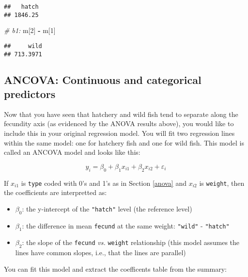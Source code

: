 \documentclass[]{book}
\newenvironment{Shaded}{\begin{snugshade}}{\end{snugshade}}
\newcommand{\DecValTok}[1]{\textcolor[rgb]{0.00,0.00,0.81}{#1}}
\newcommand{\StringTok}[1]{\textcolor[rgb]{0.31,0.60,0.02}{#1}}
\newcommand{\CommentTok}[1]{\textcolor[rgb]{0.56,0.35,0.01}{\textit{#1}}}
\newcommand{\OperatorTok}[1]{\textcolor[rgb]{0.81,0.36,0.00}{\textbf{#1}}}
\newcommand{\NormalTok}[1]{#1}
\providecommand{\tightlist}{%
  \setlength{\itemsep}{0pt}\setlength{\parskip}{0pt}}
\theoremstyle{definition}
\theoremstyle{definition}
\theoremstyle{definition}
\theoremstyle{remark}
\begin{document}
\begin{verbatim}
##   hatch 
## 1846.25
\end{verbatim}

\begin{Shaded}
\begin{Highlighting}[]
\CommentTok{# b1:}
\NormalTok{m[}\DecValTok{2}\NormalTok{] }\OperatorTok{-}\StringTok{ }\NormalTok{m[}\DecValTok{1}\NormalTok{]}
\end{Highlighting}
\end{Shaded}

\begin{verbatim}
##     wild 
## 713.3971
\end{verbatim}

\subsection{ANCOVA: Continuous and categorical
predictors}\label{ancova-continuous-and-categorical-predictors}

Now that you have seen that hatchery and wild fish tend to separate
along the fecundity axis (as evidenced by the ANOVA results above), you
would like to include this in your original regression model. You will
fit two regression lines within the same model: one for hatchery fish
and one for wild fish. This model is called an ANCOVA model and looks
like this:

\begin{equation}
  y_i=\beta_0 + \beta_1 x_{i1} + \beta_2 x_{i2} + \varepsilon_i
\label{eq:ancova}
\end{equation}

If \(x_{i1}\) is \texttt{type} coded with 0's and 1's as in Section
\ref{anova} and \(x_{i2}\) is \texttt{weight}, then the coefficients are
interpretted as:

\begin{itemize}
\tightlist
\item
  \(\beta_0\): the y-intercept of the \texttt{"hatch"} level (the
  reference level)
\item
  \(\beta_1\): the difference in mean \texttt{fecund} at the same
  weight: \texttt{"wild"} - \texttt{"hatch"}
\item
  \(\beta_2\): the slope of the \texttt{fecund} \emph{vs.}
  \texttt{weight} relationship (this model assumes the lines have common
  slopes, i.e., that the lines are parallel)
\end{itemize}

You can fit this model and extract the coefficents table from the
summary:
\end{document}

